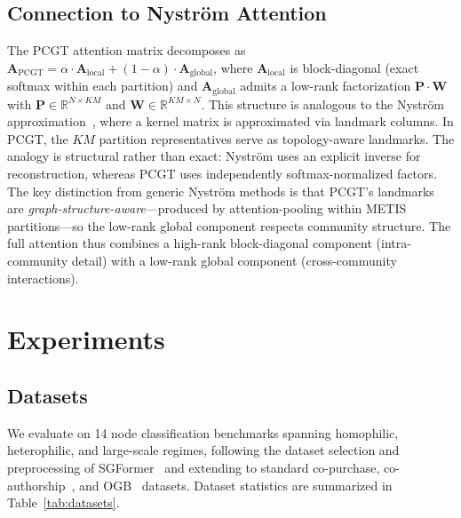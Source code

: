 \documentclass[manuscript, screen, review, anonymous]{acmart}
\begin{document}
\subsection{Connection to Nystr\"om Attention}
\label{sec:nystrom}

The PCGT attention matrix decomposes as $\mathbf{A}_{\mathrm{PCGT}} = \alpha \cdot \mathbf{A}_{\mathrm{local}} + (1-\alpha) \cdot \mathbf{A}_{\mathrm{global}}$, where $\mathbf{A}_{\mathrm{local}}$ is block-diagonal (exact softmax within each partition) and $\mathbf{A}_{\mathrm{global}}$ admits a low-rank factorization $\mathbf{P} \cdot \mathbf{W}$ with $\mathbf{P} \in \mathbb{R}^{N \times KM}$ and $\mathbf{W} \in \mathbb{R}^{KM \times N}$. This structure is analogous to the Nystr\"om approximation~\cite{xiong2021nystromformer}, where a kernel matrix is approximated via landmark columns. In PCGT, the $KM$ partition representatives serve as topology-aware landmarks. The analogy is structural rather than exact: Nystr\"om uses an explicit inverse for reconstruction, whereas PCGT uses independently softmax-normalized factors. The key distinction from generic Nystr\"om methods is that PCGT's landmarks are \emph{graph-structure-aware}---produced by attention-pooling within METIS partitions---so the low-rank global component respects community structure. The full attention thus combines a high-rank block-diagonal component (intra-community detail) with a low-rank global component (cross-community interactions).


\section{Experiments}
\label{sec:experiments}

\subsection{Datasets}

We evaluate on 14 node classification benchmarks spanning homophilic, heterophilic, and large-scale regimes, following the dataset selection and preprocessing of SGFormer~\cite{wu2023sgformer} and extending to standard co-purchase, co-authorship~\cite{shchur2018pitfalls}, and OGB~\cite{hu2020ogb} datasets. Dataset statistics are summarized in Table~\ref{tab:datasets}.
\end{document}
